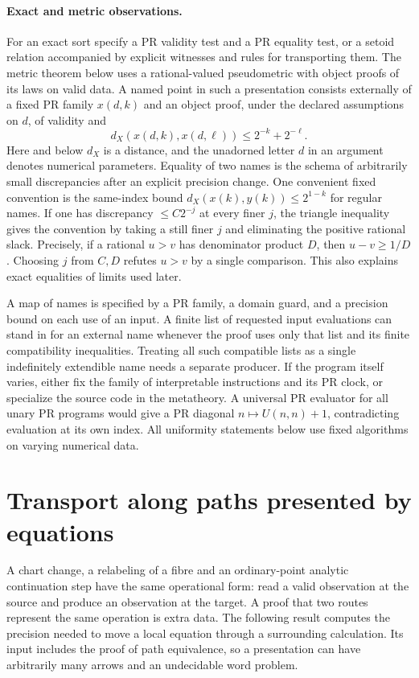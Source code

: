\paragraph{Exact and metric observations.}
For an exact sort specify a PR validity test and a PR equality test, or a setoid relation accompanied by explicit witnesses and rules for transporting them. The metric theorem below uses a rational-valued pseudometric with object proofs of its laws on valid data. A named point in such a presentation consists externally of a fixed PR family $x(d,k)$ and an object proof, under the declared assumptions on $d$, of validity and
\[
 d_X(x(d,k),x(d,\ell))\le 2^{-k}+2^{-\ell}.
\]
Here and below $d_X$ is a distance, and the unadorned letter $d$ in an argument denotes numerical parameters. Equality of two names is the schema of arbitrarily small discrepancies after an explicit precision change. One convenient fixed convention is the same-index bound $d_X(x(k),y(k))\le2^{1-k}$ for regular names. If one has discrepancy $\le C2^{-j}$ at every finer $j$, the triangle inequality gives the convention by taking a still finer $j$ and eliminating the positive rational slack. Precisely, if a rational $u>v$ has denominator product $D$, then $u-v\ge1/D$. Choosing $j$ from $C,D$ refutes $u>v$ by a single comparison. This also explains exact equalities of limits used later.

A map of names is specified by a PR family, a domain guard, and a precision bound on each use of an input. A finite list of requested input evaluations can stand in for an external name whenever the proof uses only that list and its finite compatibility inequalities. Treating all such compatible lists as a single indefinitely extendible name needs a separate producer. If the program itself varies, either fix the family of interpretable instructions and its PR clock, or specialize the source code in the metatheory. A universal PR evaluator for all unary PR programs would give a PR diagonal $n\mapsto U(n,n)+1$, contradicting evaluation at its own index. All uniformity statements below use fixed algorithms on varying numerical data.

\section{Transport along paths presented by equations}
\label{sec:transport}

A chart change, a relabeling of a fibre and an ordinary-point analytic continuation step have the same operational form: read a valid observation at the source and produce an observation at the target. A proof that two routes represent the same operation is extra data. The following result computes the precision needed to move a local equation through a surrounding calculation. Its input includes the proof of path equivalence, so a presentation can have arbitrarily many arrows and an undecidable word problem.

